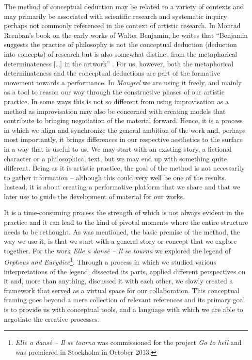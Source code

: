 \documentclass[11pt]{article}
\begin{document}
The method of conceptual deduction may be related to a variety of
contexts and may primarily be associated with scientific research and systematic inquiry perhaps not
commonly referenced in the context of artistic research. In Monrad Rrenban's book
on the early works of Walter Benjamin, he writes that ``Benjamin
suggests the practice of philosophy is not the conceptual deduction
(deduction into concepts) of research but is also somewhat distinct
from the metaphorical determinateness [\ldots] in the artwork''
\citep[p. 117]{rrenban2005}. For us, however, both the metaphorical
determinateness and the conceptual deductions are part of the
formative movement towards a performance. In \emph{Mongrel} we
are using it freely, and mainly as a tool to reason our way through the
constructive phases of our artistic practice. In some ways this is not
so different from using improvisation as a method as improvisation may
also be concerned
with creating models that contribute to bringing negotiation of
the material forward. Hence, it is a process in
which we align and synchronize the general ambition of the work and,
perhaps most importantly, it brings differences in our respective
aesthetics to the surface in a way that is useful to us. We may start with an existing story, a
fictional character or a philosophical text, but we may end up with
something quite different. Being as it is artistic
practice, the goal of the method is not necessarily to gather information --
although this could very well be one of the results. Instead, it is about
creating a performative platform that we share and that we later use
to guide the development of material for our works. 

It is a time-consuming process the strength of which is not always
evident in the practice and it can lead to the kind of pivotal moments
where the entire structure needs to be rethought. As was mentioned,
the basic premise of the method, the way we use it, is that we start
with a general story or concept that we explore together.  For the
work \emph{Elle a dansè – Il se tourna} \citep[][]{mongrel2013} we
explored the legend of \emph{Orpheus and Eurydice}\footnote{\emph{Elle
    a dansè – Il se tourna} was commissioned for the project \emph{Go
    to hell} and was premiered in Stockholm in October 2013.}. Through
a process in which we studied various interpretations of the legend,
dissected its parts, applied different perspectives on it and, more
than anything, discussed it with each other, we slowly created a
framework that served as a virtual space for our collaboration. This
conceptual framing \citep[][p.199-201]{Olofsson2018} goes beyond a
mere collection of relevant references and its primary goal is to
provide us with conceptual tools, and a language with which we are
able to negotiate the creative processes.
\end{document}
